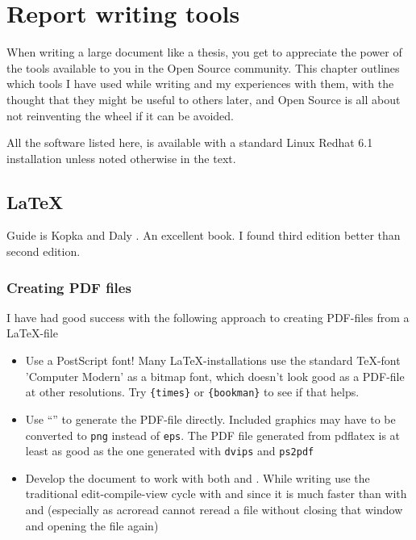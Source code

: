 
\chapter{Report writing tools}

When writing a large document like a thesis, you get to appreciate the
power of the tools available to you in the Open Source community.
This chapter outlines which tools I have used while writing and my
experiences with them, with the thought that they might be useful to
others later, and Open Source is all about not reinventing the wheel
if it can be avoided.  

All the software listed here, is available with a standard Linux
Redhat 6.1 installation unless noted otherwise in the text.


\section{\LaTeX}
\label{sec:report-writing-tools-latex}


Guide is Kopka and Daly \cite{a-guide-to-latex}.  An excellent book.
I found third edition better than second edition.


\subsection{Creating PDF files}
\label{sec:report-writing-creating-pdf-files}

I have had good success with the following approach to creating
PDF-files from a \LaTeX-file


\begin{itemize}
\item Use a PostScript font!  Many \LaTeX-installations use the
  standard \TeX-font 'Computer Modern' as a bitmap font, which doesn't
  look good as a PDF-file at other resolutions.   Try
  \texttt{\{times\}} or
  \texttt{\{bookman\}} to see if that helps.
\item Use ``'' to generate the PDF-file
  directly.  Included graphics may have to be converted to
  \texttt{png} instead of \texttt{eps}.  The PDF file generated from
  pdflatex is at least as good as the one generated with
  \texttt{dvips} and \texttt{ps2pdf}
\item Develop the document to work with both  and
  .  While writing use the traditional
  edit-compile-view cycle with  and
   since it is much faster than with
   and  (especially as
  acroread cannot reread a file without closing that window and
  opening the file again)
\end{itemize}

